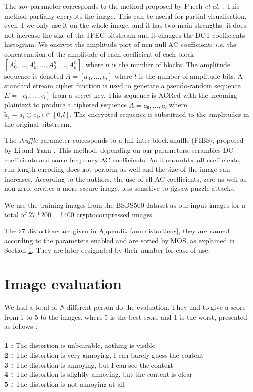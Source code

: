 \documentclass{article}
\begin{document}

The \textit{xor} parameter corresponds to the method proposed by Puech \textit{et al.} \cite{fernandez2012advanced}. This method partially encrypts the image. This can be useful for partial visualisation, even if we only use it on the whole image, and it has two main strengths: it does not increase the size of the JPEG bitstream and it changes the DCT coefficients histogram. We encrypt the amplitude part of non null AC coefficients \textit{i.e.} the concatenation of the amplitude of each coefficient of each block $[A_0^i,..., A_k^i,..., A_0^n,..., A_k^n]$, where $n$ is the number of blocks. The amplitude sequence is denoted $A = [a_0,..., a_l]$ where $l$ is the number of amplitude bits. A standard stream cipher function is used to generate a pseudo-random sequence $E = [e_0,..., e_l]$ from a secret key. This sequence is XORed with the incoming plaintext to produce a ciphered sequence $\widetilde{A} = \widetilde{a}_0,..., \widetilde{a}_l$ where $\widetilde{a}_i = a_i \oplus e_i, i \in [0,l]$. The encrypted sequence is substitued to the amplitudes in the original bitstream.

The \textit{shuffle} parameter corresponds to a full inter-block shuffle (FIBS), proposed by Li and Yuan \cite{li2007leak}. This method, depending on our parameters, scrambles DC coefficients and same frequency AC coefficients. As it scrambles all coefficients, run length encoding does not perform as well and the size of the image can increases. According to the authors, the use of all AC coefficients, zero as well as non-zero, creates a more secure image, less sensitive to jigsaw puzzle attacks.

We use the training images from the BSDS500 \cite{amfm_pami2011} dataset as our input images for a total of $27 * 200 = 5400$ cryptocompressed images.

The 27 distortions are given in Appendix \ref{ann:distortions}, they are named according to the parameters enabled and are sorted by MOS, as explained in Section \ref{sec:evaluation}. They are later designated by their number for ease of use.

\section{Image evaluation}
\label{sec:evaluation}
We had a total of \textit{N} different person do the evaluation. They had to give a score from 1 to 5 to the images, where 5 is the best score and 1 is the worst, presented as follows :\\\\
\textbf{1 :} The distortion is unbearable, nothing is visible\\
\textbf{2 :} \small{The distortion is very annoying, I can barely guess the content}\normalsize{}\\
\textbf{3 :} The distortion is annoying, but I can see the content\\
\textbf{4 :} The distortion is slightly annoying, but the content is clear\\
\textbf{5 :} The distortion is not annoying at all \\
\end{document}
